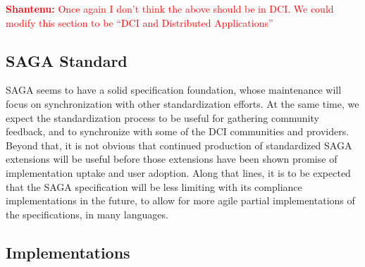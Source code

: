 \documentclass[]{article}
\newcommand{\B}[1]{\textbf{#1}}
\newcommand{\jhanote}[1]{{\textcolor{red}{     \B{Shantenu:} #1 }}}
\newcommand{\jhanote}[1]{}
\begin{document}
 \jhanote{Once again I don't think the above should be in DCI. We
   could modify this section to be ``DCI and Distributed
   Applications''}
 
 \subsection{SAGA Standard}

  SAGA seems to have a solid specification foundation, whose
  maintenance will focus on synchronization with other
  standardization efforts.  At the same time, we expect the
  standardization process to be useful for gathering community
  feedback, and to synchronize with some of the DCI communities and
  providers.  Beyond that, it is not obvious that continued production
  of standardized SAGA extensions will be useful before those
  extensions have been shown promise of implementation uptake and user
  adoption.  Along that lines, it is to be expected that the SAGA
  specification will be less limiting with its compliance
  implementations in the future, to allow for more agile partial
  implementations of the specifications, in many languages.


 \subsection{Implementations}


\end{document}
